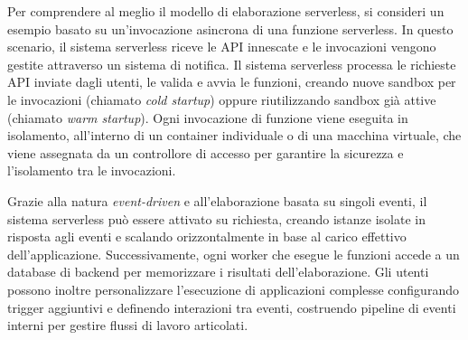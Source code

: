 Per comprendere al meglio il modello di elaborazione serverless, si consideri un esempio basato su un'invocazione asincrona di una funzione serverless. In questo scenario, il sistema serverless riceve le API innescate e le invocazioni vengono gestite attraverso un sistema di notifica. Il sistema serverless processa le richieste API inviate dagli utenti, le valida e avvia le funzioni, creando nuove sandbox per le invocazioni (chiamato \textit{cold startup}) oppure riutilizzando sandbox già attive (chiamato \textit{warm startup}). Ogni invocazione di funzione viene eseguita in isolamento, all'interno di un container individuale o di una macchina virtuale, che viene assegnata da un controllore di accesso per garantire la sicurezza e l'isolamento tra le invocazioni.

Grazie alla natura \textit{event-driven} e all’elaborazione basata su singoli eventi, il sistema serverless può essere attivato su richiesta, creando istanze isolate in risposta agli eventi e scalando orizzontalmente in base al carico effettivo dell'applicazione. Successivamente, ogni worker che esegue le funzioni accede a un database di backend per memorizzare i risultati dell'elaborazione. Gli utenti possono inoltre personalizzare l'esecuzione di applicazioni complesse configurando trigger aggiuntivi e definendo interazioni tra eventi, costruendo pipeline di eventi interni per gestire flussi di lavoro articolati.\cite{10.1145/3508360}
